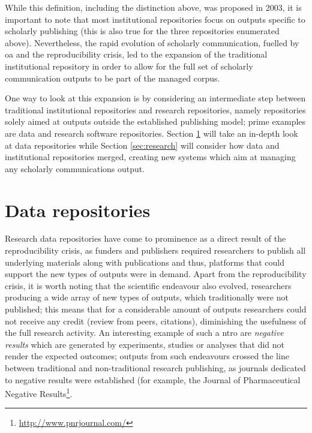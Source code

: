 While this definition, including the distinction above, was proposed in 2003, it is important to note that most institutional repositories focus on outputs specific to scholarly publishing (this is also true for the three repositories enumerated above). Nevertheless, the rapid evolution of scholarly communication, fuelled by \gls{oa} and the reproducibility crisis, led to the expansion of the traditional institutional repository in order to allow for the full set of scholarly communication outputs to be part of the managed corpus.

One way to look at this expansion is by considering an intermediate step between traditional institutional repositories and research repositories, namely repositories solely aimed at outputs outside the established publishing model; prime examples are data and research software repositories. Section \ref{sec:data} will take an in-depth look at data repositories while Section \ref{sec:research} will consider how data and institutional repositories merged, creating new systems which aim at managing any scholarly communications output.


\section{Data repositories}
\label{sec:data}

Research data repositories have come to prominence as a direct result of the reproducibility crisis, as funders and publishers required researchers to publish all underlying materials along with publications and thus, platforms that could support the new types of outputs were in demand. Apart from the reproducibility crisis, it is worth noting that the scientific endeavour also evolved, researchers producing a wide array of new types of outputs, which traditionally were not published; this means that for a considerable amount of outputs researchers could not receive any credit (review from peers, citations), diminishing the usefulness of the full research activity. An interesting example of such a \gls{ntro} are \emph{negative results} which are generated by experiments, studies or analyses that did not render the expected outcomes; outputs from such endeavours crossed the line between traditional and non-traditional research publishing, as journals dedicated to negative results were established (for example, the Journal of Pharmaceutical Negative Results\footnote{\url{http://www.pnrjournal.com/}}.

